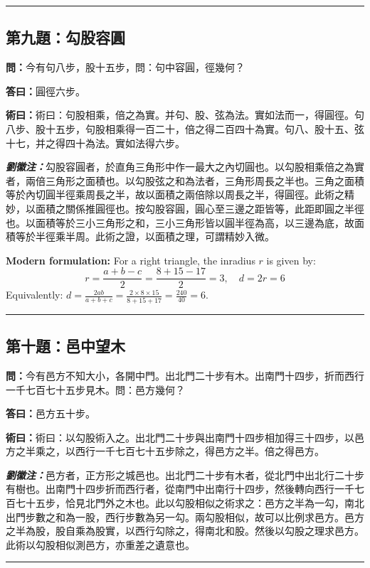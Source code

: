 \documentclass[11pt,a4paper]{article}
\newcommand{\wen}[1]{\textbf{\color{problemcolor}問：}#1\par}
\newcommand{\da}[1]{\textbf{答曰：}#1\par}
\newcommand{\shu}[1]{\textbf{術曰：}#1\par}
\newcommand{\liuhui}[1]{{\color{commentarycolor}\textit{\textbf{劉徽注：}}#1\par}}
\begin{document}
\bigskip
\hrule
\bigskip

\subsection{第九題：勾股容圓}

\wen{今有句八步，股十五步，問：句中容圓，徑幾何？}

\da{圓徑六步。}

\shu{術曰：句股相乘，倍之為實。并句、股、弦為法。實如法而一，得圓徑。句八步、股十五步，句股相乘得一百二十，倍之得二百四十為實。句八、股十五、弦十七，并之得四十為法。實如法得六步。}

\liuhui{勾股容圓者，於直角三角形中作一最大之內切圓也。以勾股相乘倍之為實者，兩倍三角形之面積也。以勾股弦之和為法者，三角形周長之半也。三角之面積等於內切圓半徑乘周長之半，故以面積之兩倍除以周長之半，得圓徑。此術之精妙，以面積之關係推圓徑也。按勾股容圓，圓心至三邊之距皆等，此距即圓之半徑也。以面積等於三小三角形之和，三小三角形皆以圓半徑為高，以三邊為底，故面積等於半徑乘半周。此術之證，以面積之理，可謂精妙入微。}

\textbf{Modern formulation:} For a right triangle, the inradius $r$ is given by:
\[r = \frac{a + b - c}{2} = \frac{8 + 15 - 17}{2} = 3, \quad d = 2r = 6\]
Equivalently: $d = \frac{2ab}{a+b+c} = \frac{2 \times 8 \times 15}{8+15+17} = \frac{240}{40} = 6$.

\bigskip
\hrule
\bigskip

\subsection{第十題：邑中望木}

\wen{今有邑方不知大小，各開中門。出北門二十步有木。出南門十四步，折而西行一千七百七十五步見木。問：邑方幾何？}

\da{邑方五十步。}

\shu{術曰：以勾股術入之。出北門二十步與出南門十四步相加得三十四步，以邑方之半乘之，以西行一千七百七十五步除之，得邑方之半。倍之得邑方。}

\liuhui{邑方者，正方形之城邑也。出北門二十步有木者，從北門中出北行二十步有樹也。出南門十四步折而西行者，從南門中出南行十四步，然後轉向西行一千七百七十五步，恰見北門外之木也。此以勾股相似之術求之：邑方之半為一勾，南北出門步數之和為一股，西行步數為另一勾。兩勾股相似，故可以比例求邑方。邑方之半為股，股自乘為股實，以西行勾除之，得南北和股。然後以勾股之理求邑方。此術以勾股相似測邑方，亦重差之遺意也。}

\bigskip
\hrule
\bigskip
\end{document}
